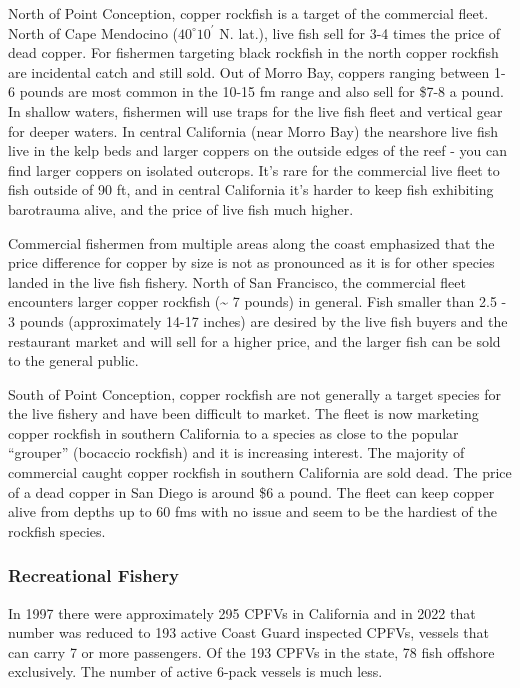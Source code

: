 \documentclass[11pt,
  english,
  letterpaper,
]{article}
\begin{document}
North of Point Conception, copper rockfish is a target of the commercial fleet. North of Cape Mendocino ($40^\circ 10^\prime$ N. lat.), live fish sell for 3-4 times the price of dead copper. For fishermen targeting black rockfish in the north copper rockfish are incidental catch and still sold. Out of Morro Bay, coppers ranging between 1-6 pounds are most common in the 10-15 fm range and also sell for \$7-8 a pound. In shallow waters, fishermen will use traps for the live fish fleet and vertical gear for deeper waters. In central California (near Morro Bay) the nearshore live fish live in the kelp beds and larger coppers on the outside edges of the reef - you can find larger coppers on isolated outcrops. It's rare for the commercial live fleet to fish outside of 90 ft, and in central California it's harder to keep fish exhibiting barotrauma alive, and the price of live fish much higher.

Commercial fishermen from multiple areas along the coast emphasized that the price difference for copper by size is not as pronounced as it is for other species landed in the live fish fishery. North of San Francisco, the commercial fleet encounters larger copper rockfish (\textasciitilde{} 7 pounds) in general. Fish smaller than 2.5 - 3 pounds (approximately 14-17 inches) are desired by the live fish buyers and the restaurant market and will sell for a higher price, and the larger fish can be sold to the general public.

South of Point Conception, copper rockfish are not generally a target species for the live fishery and have been difficult to market. The fleet is now marketing copper rockfish in southern California to a species as close to the popular ``grouper'' (bocaccio rockfish) and it is increasing interest. The majority of commercial caught copper rockfish in southern California are sold dead. The price of a dead copper in San Diego is around \$6 a pound. The fleet can keep copper alive from depths up to 60 fms with no issue and seem to be the hardiest of the rockfish species.

\hypertarget{recreational-fishery-1}{%
\subsubsection{Recreational Fishery}\label{recreational-fishery-1}}

In 1997 there were approximately 295 CPFVs in California and in 2022 that number was reduced to 193 active Coast Guard inspected CPFVs, vessels that can carry 7 or more passengers. Of the 193 CPFVs in the state, 78 fish offshore exclusively. The number of active 6-pack vessels is much less.
\end{document}
